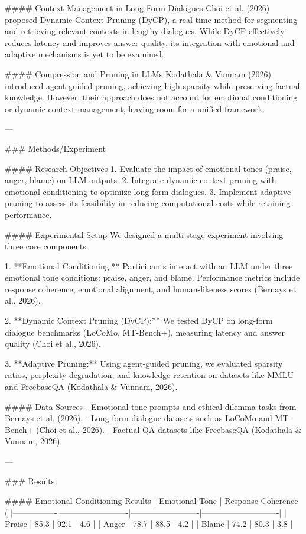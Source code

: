 #### Context Management in Long-Form Dialogues  
Choi et al. (2026) proposed Dynamic Context Pruning (DyCP), a real-time method for segmenting and retrieving relevant contexts in lengthy dialogues. While DyCP effectively reduces latency and improves answer quality, its integration with emotional and adaptive mechanisms is yet to be examined.  

#### Compression and Pruning in LLMs  
Kodathala & Vunnam (2026) introduced agent-guided pruning, achieving high sparsity while preserving factual knowledge. However, their approach does not account for emotional conditioning or dynamic context management, leaving room for a unified framework.

---

### Methods/Experiment  

#### Research Objectives  
1. Evaluate the impact of emotional tones (praise, anger, blame) on LLM outputs.  
2. Integrate dynamic context pruning with emotional conditioning to optimize long-form dialogues.  
3. Implement adaptive pruning to assess its feasibility in reducing computational costs while retaining performance.  

#### Experimental Setup  
We designed a multi-stage experiment involving three core components:  

1. **Emotional Conditioning:** Participants interact with an LLM under three emotional tone conditions: praise, anger, and blame. Performance metrics include response coherence, emotional alignment, and human-likeness scores (Bernays et al., 2026).  

2. **Dynamic Context Pruning (DyCP):** We tested DyCP on long-form dialogue benchmarks (LoCoMo, MT-Bench+), measuring latency and answer quality (Choi et al., 2026).  

3. **Adaptive Pruning:** Using agent-guided pruning, we evaluated sparsity ratios, perplexity degradation, and knowledge retention on datasets like MMLU and FreebaseQA (Kodathala & Vunnam, 2026).  

#### Data Sources  
- Emotional tone prompts and ethical dilemma tasks from Bernays et al. (2026).  
- Long-form dialogue datasets such as LoCoMo and MT-Bench+ (Choi et al., 2026).  
- Factual QA datasets like FreebaseQA (Kodathala & Vunnam, 2026).

---

### Results  

#### Emotional Conditioning Results  
| Emotional Tone | Response Coherence (%
|----------------|-------------------------|-------------------------|----------------------------|  
| Praise         | 85.3                   | 92.1                   | 4.6                        |  
| Anger          | 78.7                   | 88.5                   | 4.2                        |  
| Blame          | 74.2                   | 80.3                   | 3.8                        |  

